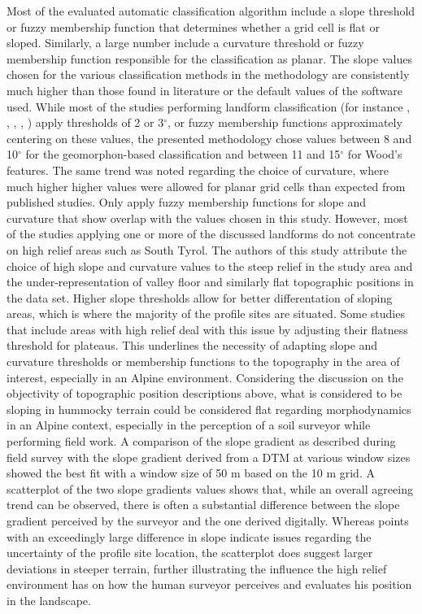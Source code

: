 \documentclass[final,1p,times,twocolumn,authoryear]{elsarticle}
\begin{document}
Most of the evaluated automatic classification algorithm include a slope threshold or fuzzy membership function that determines whether a grid cell is flat or sloped. Similarly, a large number include a curvature threshold or fuzzy membership function responsible for the classification as planar. The slope values chosen for the various classification methods in the methodology are consistently much higher than those found in literature or the default values of the software used. While most of the studies performing landform classification (for instance \cite{Barka2011}, \cite{Bocco2001}, \cite{Ehsani2008}, \cite{Jasiewicz2013}, \cite{MacMillan2000a}) apply thresholds of 2 or 3$^{\circ}$, or fuzzy membership functions approximately centering on these values, the presented methodology chose values between 8 and 10$^{\circ}$ for the geomorphon-based classification and between 11 and 15$^{\circ}$ for Wood's features. The same trend was noted regarding the choice of curvature, where much higher higher values were allowed for planar grid cells than expected from published studies. Only \cite{Schmidt2004} apply fuzzy membership functions for slope and curvature that show overlap with the values chosen in this study. However, most of the studies applying one or more of the discussed landforms do not concentrate on high relief areas such as South Tyrol. The authors of this study attribute the choice of high slope and curvature values to the steep relief in the study area and the under-representation of valley floor and similarly flat topographic positions in the data set. Higher slope  thresholds allow for better differentation of sloping areas, which is where the majority of the profile sites are situated. Some studies that include areas with high relief \citep{Bocco2001,Herbst2012} deal with this issue by adjusting their flatness threshold for plateaus. This underlines the necessity of adapting slope and curvature thresholds or membership functions to the topography in the area of interest, especially in an Alpine environment. Considering the discussion on the objectivity of topographic position descriptions above, what is considered to be sloping in hummocky terrain could be considered flat regarding morphodynamics in an Alpine context, especially in the perception of a soil surveyor while performing field work. A comparison of the slope gradient as described during field survey with the slope gradient derived from a DTM at various window sizes showed the best fit with a window size of 50 m based on the 10 m grid. A scatterplot of the two slope gradients values shows that, while an overall agreeing trend can be observed, there is often a substantial difference between the slope gradient perceived by the surveyor and the one derived digitally. Whereas points with an exceedingly large difference in slope indicate issues regarding the uncertainty of the profile site location, the scatterplot does suggest larger deviations in steeper terrain, further illustrating the influence the high relief environment has on how the human surveyor perceives and evaluates his position in the landscape. 
\end{document}
